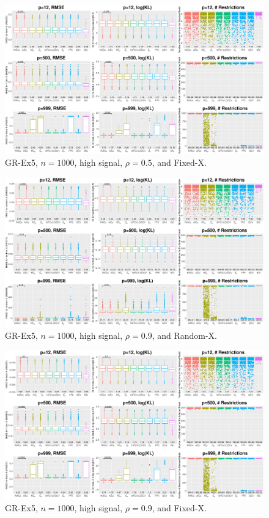 \begin{figure}[!ht]
\centering
\includegraphics[width=\textwidth]{figures/supplement/fixedx_GR-Ex5_n1000_hsnr_rho05.eps}
\caption{GR-Ex5, $n=1000$, high signal, $\rho=0.5$, and Fixed-X.}
\end{figure}
\clearpage
\begin{figure}[!ht]
\centering
\includegraphics[width=\textwidth]{figures/supplement/randomx_GR-Ex5_n1000_hsnr_rho09.eps}
\caption{GR-Ex5, $n=1000$, high signal, $\rho=0.9$, and Random-X.}
\end{figure}
\begin{figure}[!ht]
\centering
\includegraphics[width=\textwidth]{figures/supplement/fixedx_GR-Ex5_n1000_hsnr_rho09.eps}
\caption{GR-Ex5, $n=1000$, high signal, $\rho=0.9$, and Fixed-X.}
\end{figure}
